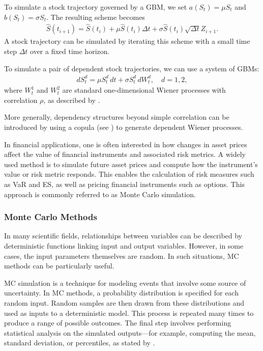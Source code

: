 To simulate a stock trajectory governed by a \gls{GBM}, we set $a(S_t) = \mu S_t$ and $b(S_t) = \sigma S_t$. The resulting scheme becomes
\begin{align*}
    \hat{S}(t_{i+1}) = \hat{S}(t_i) + \mu \hat{S}(t_i) \Delta t + \sigma \hat{S}(t_i) \sqrt{\Delta t} Z_{i+1}.
\end{align*}
A stock trajectory can be simulated by iterating this scheme with a small time step $\Delta t$ over a fixed time horizon.

To simulate a pair of dependent stock trajectories, we can use a system of \gls{GBM}s:
\begin{align*}
    dS_t^d = \mu S_t^d \,dt + \sigma S_t^d \,dW_t^d, \quad d = 1, 2,
\end{align*}
where $W_t^1$ and $W_t^2$ are standard one-dimensional Wiener processes with correlation $\rho$, as described by \citet[p.~104]{glasserman2004monte}.

More generally, dependency structures beyond simple correlation can be introduced by using a copula (see ) to generate dependent Wiener processes.

In financial applications, one is often interested in how changes in asset prices affect the value of financial instruments and associated risk metrics. A widely used method is to simulate future asset prices and compute how the instrument's value or risk metric responds. This enables the calculation of risk measures such as \gls{VaR} and \gls{ES}, as well as pricing financial instruments such as options. This approach is commonly referred to as Monte Carlo simulation.

\subsubsection{Monte Carlo Methods} \label{sec:MonteCarlo}
In many scientific fields, relationships between variables can be described by deterministic functions linking input and output variables. However, in some cases, the input parameters themselves are random. In such situations, \gls{MC} methods can be particularly useful.

\gls{MC} simulation is a technique for modeling events that involve some source of uncertainty. In \gls{MC} methods, a probability distribution is specified for each random input. Random samples are then drawn from these distributions and used as inputs to a deterministic model. This process is repeated many times to produce a range of possible outcomes. The final step involves performing statistical analysis on the simulated outputs—for example, computing the mean, standard deviation, or percentiles, as stated by \citet[pp.~91--92]{Raychaudhuri2008}.

